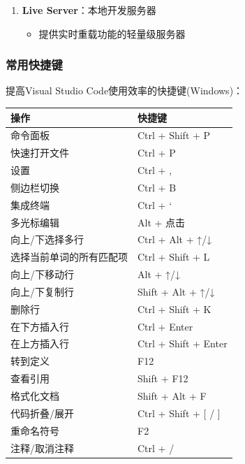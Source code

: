 \begin{enumerate}
  \begin{itemize}
  \tightlist
  \item
    在编辑器中直接发送HTTP请求和查看响应
  \end{itemize}
\item
  \textbf{Live Server}：本地开发服务器

  \begin{itemize}
  \tightlist
  \item
    提供实时重载功能的轻量级服务器
  \end{itemize}
\end{enumerate}

\subsubsection{常用快捷键}\label{ux5e38ux7528ux5febux6377ux952e-1}

提高Visual Studio Code使用效率的快捷键(Windows)：

\begin{longtable}[]{@{}ll@{}}
\toprule\noalign{}
操作 & 快捷键 \\
\midrule\noalign{}
\endhead
\bottomrule\noalign{}
\endlastfoot
命令面板 & Ctrl + Shift + P \\
快速打开文件 & Ctrl + P \\
设置 & Ctrl + , \\
侧边栏切换 & Ctrl + B \\
集成终端 & Ctrl + ` \\
多光标编辑 & Alt + 点击 \\
向上/下选择多行 & Ctrl + Alt + ↑/↓ \\
选择当前单词的所有匹配项 & Ctrl + Shift + L \\
向上/下移动行 & Alt + ↑/↓ \\
向上/下复制行 & Shift + Alt + ↑/↓ \\
删除行 & Ctrl + Shift + K \\
在下方插入行 & Ctrl + Enter \\
在上方插入行 & Ctrl + Shift + Enter \\
转到定义 & F12 \\
查看引用 & Shift + F12 \\
格式化文档 & Shift + Alt + F \\
代码折叠/展开 & Ctrl + Shift + {[} / {]} \\
重命名符号 & F2 \\
注释/取消注释 & Ctrl + / \\
\end{longtable}

